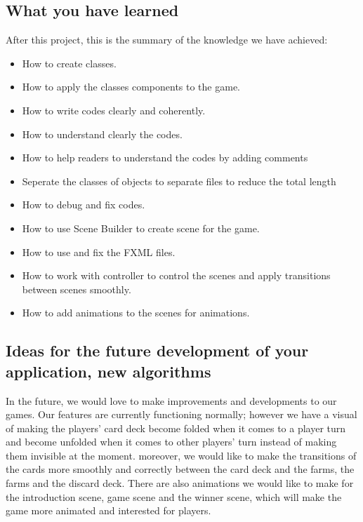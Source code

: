 \documentclass[conference]{IEEEtran}
\begin{document}
\subsection{What you have learned}
After this project, this is the summary of the knowledge we have achieved:
\begin{itemize}
    \item How to create classes.
    \item How to apply the classes components to the game.
    \item How to write codes clearly and coherently.
    \item How to understand clearly the codes.
    \item How to help readers to understand the codes by adding comments
    \item Seperate the classes of objects to separate files to reduce the total length
    \item How to debug and fix codes.
    \item How to use Scene Builder to create scene for the game.
    \item How to use and fix the FXML files.
    \item How to work with controller to control the scenes and apply transitions between scenes smoothly.
    \item How to add animations to the scenes for animations.
\end{itemize}

\subsection{Ideas for the future development of your application, new algorithms}
In the future, we would love to make improvements and developments to our games. Our features are currently functioning normally; however we have a visual of making the players' card deck become folded when it comes to a player turn and become unfolded when it comes to other players' turn instead of making them invisible at the moment. moreover, we would like to make the transitions of the cards more smoothly and correctly between the card deck and the farms, the farms and the discard deck. There are also animations we would like to make for the introduction scene, game scene and the winner scene, which will make the game more animated and interested for players. 

\end{document}
